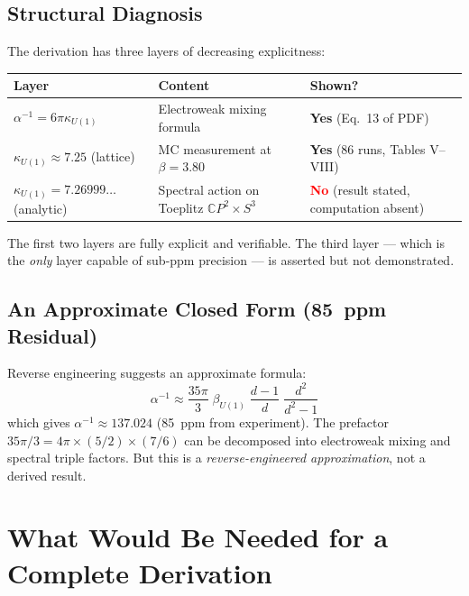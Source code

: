 \documentclass[12pt,a4paper]{article}
\begin{document}
\subsection{Structural Diagnosis}

The derivation has three layers of decreasing explicitness:

\begin{center}
\renewcommand{\arraystretch}{1.3}
\begin{tabular}{lp{5cm}l}
\toprule
Layer & Content & Shown? \\
\midrule
$\alpha^{-1} = 6\pi\kappa_{U(1)}$ & Electroweak mixing formula &
  \textbf{Yes} (Eq.~13 of PDF) \\
$\kappa_{U(1)} \approx 7.25$ (lattice) & MC measurement at
  $\beta = 3.80$ & \textbf{Yes} (86 runs, Tables V--VIII) \\
$\kappa_{U(1)} = 7.26999\ldots$ (analytic) & Spectral action on
  Toeplitz $\mathbb{C}P^2 \times S^3$ &
  \textcolor{red}{\textbf{No}} (result stated, computation absent) \\
\bottomrule
\end{tabular}
\end{center}

The first two layers are fully explicit and verifiable.
The third layer --- which is the \emph{only} layer capable of
sub-ppm precision --- is asserted but not demonstrated.

\subsection{An Approximate Closed Form (85~ppm Residual)}

Reverse engineering suggests an approximate formula:
\begin{equation}
\alpha^{-1} \approx \frac{35\pi}{3}\;\beta_{U(1)}
\;\frac{d-1}{d}\;\frac{d^2}{d^2-1}
\end{equation}
which gives $\alpha^{-1} \approx 137.024$ (85~ppm from experiment).
The prefactor $35\pi/3 = 4\pi \times (5/2) \times (7/6)$ can be
decomposed into electroweak mixing and spectral triple factors.
But this is a \emph{reverse-engineered approximation}, not a
derived result.

\section{What Would Be Needed for a Complete Derivation}
\label{sec:needed}
\end{document}
